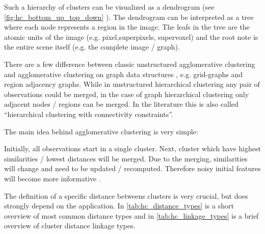 Such a hierarchy of clusters can be visualized as a dendrogram (see \cref{fig:hc_bottom_up_top_down} ).
The dendrogram can be interpreted as a tree where each node represents a
region in the image.
The leafs in the tree are the atomic units of the image (e.g. pixel,superpixels, supervoxel)
and the root note is the entire scene itself (e.g. the complete image / graph).

There are a few difference between classic unstructured agglomerative clustering
\citep{florek_1951,sokal_1958_science_bulletin,ward_63_jasa}
and agglomerative clustering on graph data structures \citep{arbelaez_2006_cvpr,iglesias_2013,morel_1995_book}, 
e.g. grid-graphs and region adjacency graphs\citep{vlachos_1993_csv}.
While in unstructured hierarchical clustering any pair of observations could be merged,
in the case of graph hierarchical clustering only adjacent nodes / regions can be merged.
In the literature this is also called ``hierarchical clustering with connectivity constraints''.


The main idea behind agglomerative clustering is very simple:

Initially, all observations start in a single cluster. 
Next, cluster which have highest similarities / lowest distances will be merged.
Due to the merging, similarities will change and need to be updated
/ recomputed. Therefore  noisy initial features
will  become more informative .

The definition of a specific distance betweens clusters is very crucial, 
but does strongly depend on the application.
In \cref{tab:hc_distance_types} is a short overview of most common distance
types and in   \cref{tab:hc_linkage_types} is a  brief overview 
of cluster distance linkage types.








